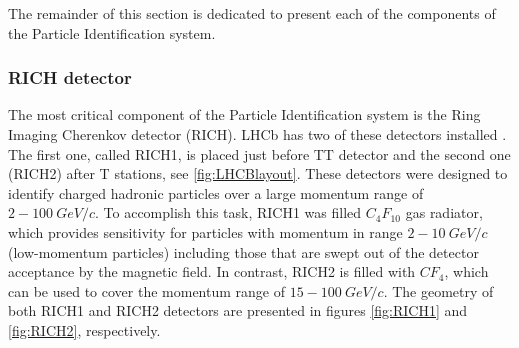 The remainder of this section is dedicated to present each of the components of the Particle Identification system.


\subsubsection{RICH detector}

The most critical component of the Particle Identification system is the Ring Imaging Cherenkov detector (RICH). LHCb has two of these detectors installed \cite{RICH_performance}. The first one, called RICH1, is placed just before TT detector and the second one (RICH2) after T stations, see \ref{fig:LHCBlayout}. These detectors were designed to identify charged hadronic particles over a large momentum range of $2-100~ GeV/c$. To accomplish this task, RICH1 was filled $C_4F_{10}$ gas radiator, which provides sensitivity for particles with momentum in range $2-10~ GeV/c$ (low-momentum particles) including those that are swept out of the detector acceptance by the magnetic field. In contrast, RICH2 is filled with $CF_4$, which can be used to cover the momentum range of $15-100~ GeV/c$. The geometry of both RICH1 and RICH2 detectors are presented in figures \ref{fig:RICH1} and \ref{fig:RICH2}, respectively. 


